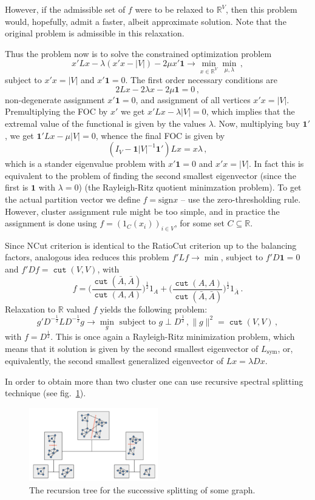 \documentclass[a4paper]{article}
\newcommand{\Real}{\mathbb{R}}
\newcommand{\cut}{\mathop{\mathtt{cut}}\nolimits}
\newcommand{\one}{\mathbf{1}}
\begin{document}
However, if the admissible set of $f$ were to be relaxed to $\Real^V$, then this
problem would, hopefully, admit a faster, albeit approximate solution. Note that
the original problem is admissible in this relaxation.

Thus the problem now is to solve the constrained optimization problem
$$ x' L x - \lambda(x' x - |V|) - 2 \mu x'\one
    \to \min_{x\in \Real^V} \min_{\mu, \lambda}
    \,, $$
subject to $x'x = |V|$ and $x'\one = 0$. The first order necessary conditions
are 
$$ 2 L x - 2 \lambda x - 2 \mu \one = 0 \,, $$
non-degenerate assignment $x'\one = 0$, and assignment of all vertices $x'x = |V|$.
Premultiplying the FOC by $x'$ we get $x' L x - \lambda |V| = 0$, which implies that
the extremal value of the functional is given by the values $\lambda$. Now, multiplying
buy $\one'$, we get $\one' L x - \mu |V| = 0$, whence the final FOC is given by
$$ (I_V - \one |V|^{-1} \one') L x = x \lambda \,, $$
which is a stander eigenvalue problem with $x'\one = 0$ and $x'x = |V|$. In fact
this is equivalent to the problem of finding the second smallest eigenvector (since
the first is $\one$ with $\lambda = 0$) (the Rayleigh-Ritz quotient minimzation
problem). To get the actual partition vector we define $f=\text{sign} x$ -- use
the zero-thresholding rule. However, cluster assignment rule might be too simple,
and in practice the assignment is done using $f = (1_C(x_i))_{i\in V}$, for some
set $C\subseteq \Real$.

Since NCut criterion is identical to the RatioCut criterion up to the balancing
factors, analogous idea reduces this problem $f'Lf \to \min$, subject to $f'D\one = 0$
and $f'Df = \cut(V,V)$, with 
$$ f
    = \biggl(\frac{\cut(\bar{A},\bar{A})}{\cut(A,A)}\biggr)^\frac{1}{2} 1_A
    + \biggl(\frac{\cut(A,A)}{\cut(\bar{A},\bar{A})}\biggr)^\frac{1}{2} 1_{\bar{A}}
    \,. $$
Relaxation to $\Real$ valued $f$ yields the following problem:
$$ g' D^{-\frac{1}{2}} L D^{-\frac{1}{2}} g \to \min_g
    \text{ subject to } g\perp D^\frac{1}{2}\,,
    \|g\|^2 = \cut(V,V)
    \,, $$
with $f=D^\frac{1}{2}$. This is once again a Rayleigh-Ritz minimization problem, which 
means that it solution is given by the second smallest eigenvector of $L_\text{sym}$,
or, equivalently, the second smallest generalized eigenvector of $Lx = \lambda D x$.


In order to obtain more than two cluster one can use recursive spectral splitting
technique (see fig.~\ref{fig:recursive_split}).
\begin{figure}
    \centering
    \includegraphics[width=0.5\textwidth]{recursive_split.png}
    \caption{The recursion tree for the successive splitting of some graph.}
    \label{fig:recursive_split}
\end{figure}
\end{document}
